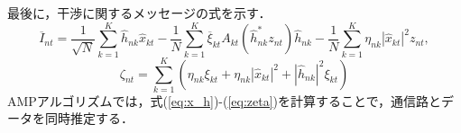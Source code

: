 最後に，干渉に関するメッセージの式を示す．
\begin{equation}
	\label{eq:I_b}
	\overline{I}_{nt}=
		\frac{1}{\sqrt{N}}
		\sum_{k=1}^{K}
			\hat{h}_{nk}\hat{x}_{kt}
		-
		\frac{1}{N}
		\sum^{K}_{k=1}
			\overline{\xi}_{kt}
			A_{kt}
			\left(
				\hat{h}_{nk}^{*}
				z_{nt}
			\right)
			\hat{h}_{nk}
		-
		\frac{1}{N}
		\sum^{K}_{k=1}
			\eta_{nk}
			|\hat{x}_{kt}|^{2}
			z_{nt},
\end{equation}
\begin{equation}
	\label{eq:zeta}
	\zeta_{nt}=
		\sum_{k=1}^{K}
			\left(
				\eta_{nk}\xi_{kt}
				+
				\eta_{nk}|\hat{x}_{kt}|^{2}
				+
				|\hat{h}_{nk}|^{2}\xi_{kt}
			\right)
\end{equation}
AMPアルゴリズムでは，式(\ref{eq:x_h})-(\ref{eq:zeta})を計算することで，通信路とデータを同時推定する．